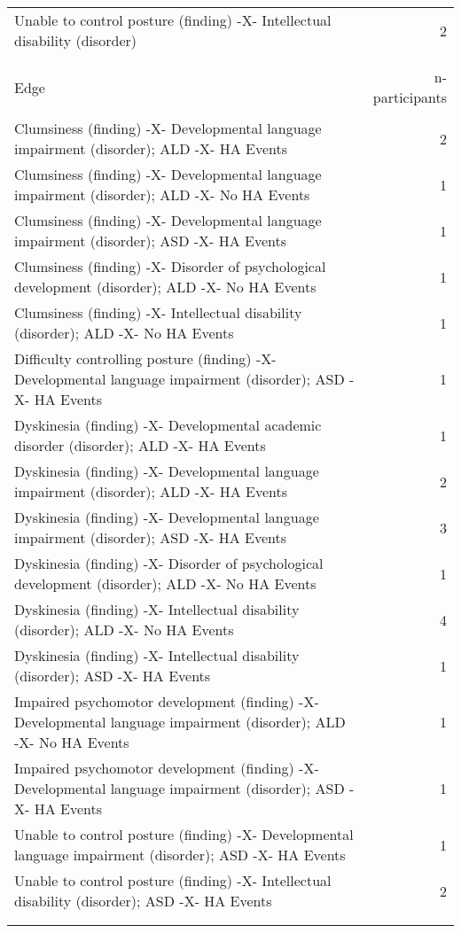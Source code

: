 \documentclass[10pt, letterpaper]{article}
\begin{document}
\begin{spacing}{1.0}
\begin{small}
\begin{longtable}[H]{p{5in}r}
        \rowcolor{ltBlue}
        Unable to control posture (finding) -X- Intellectual disability (disorder) & 2 \\
        &\\[-4pt]
        \hline\\[-8pt]
        Edge & n-participants\\
        \hline\\[-6pt]
        Clumsiness (finding) -X- Developmental language impairment (disorder); ALD -X- HA Events & 2 \\
        \rowcolor{ltBlue}
        Clumsiness (finding) -X- Developmental language impairment (disorder); ALD -X- No HA Events & 1 \\
        Clumsiness (finding) -X- Developmental language impairment (disorder); ASD -X- HA Events & 1 \\
        \rowcolor{ltBlue}
        Clumsiness (finding) -X- Disorder of psychological development (disorder); ALD -X- No HA Events & 1 \\
        Clumsiness (finding) -X- Intellectual disability (disorder); ALD -X- No HA Events & 1 \\
        \rowcolor{ltBlue}
        Difficulty controlling posture (finding) -X- Developmental language impairment (disorder); ASD -X- HA Events & 1 \\
        Dyskinesia (finding) -X- Developmental academic disorder (disorder); ALD -X- HA Events & 1 \\
        \rowcolor{ltBlue}
        Dyskinesia (finding) -X- Developmental language impairment (disorder); ALD -X- HA Events & 2 \\
        Dyskinesia (finding) -X- Developmental language impairment (disorder); ASD -X- HA Events & 3 \\
        \rowcolor{ltBlue}
        Dyskinesia (finding) -X- Disorder of psychological development (disorder); ALD -X- No HA Events & 1 \\
        Dyskinesia (finding) -X- Intellectual disability (disorder); ALD -X- No HA Events & 4 \\
        \rowcolor{ltBlue}
        Dyskinesia (finding) -X- Intellectual disability (disorder); ASD -X- HA Events & 1 \\
        Impaired psychomotor development (finding) -X- Developmental language impairment (disorder); ALD -X- No HA Events & 1 \\
        \rowcolor{ltBlue}
        Impaired psychomotor development (finding) -X- Developmental language impairment (disorder); ASD -X- HA Events & 1 \\
        Unable to control posture (finding) -X- Developmental language impairment (disorder); ASD -X- HA Events & 1 \\
        \rowcolor{ltBlue}
        Unable to control posture (finding) -X- Intellectual disability (disorder); ASD -X- HA Events & 2 \\
        & \\[-6pt]
        \hline
        \label{tab:MD-DMD-Dx-HA-01}
    \end{longtable}
\end{small}


\end{spacing}
\end{document}
